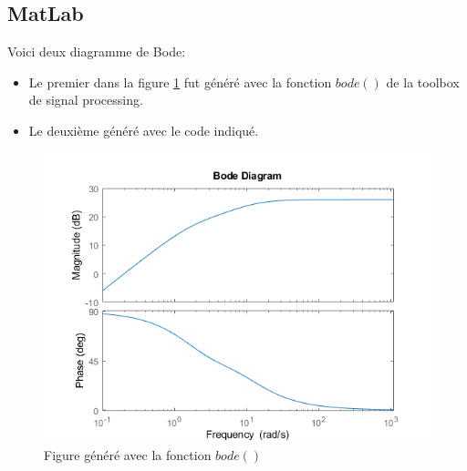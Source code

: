 \documentclass{article}
\theoremstyle{plain}%
\theoremstyle{definition}
\theoremstyle{remark}
\begin{document}
\subsection{MatLab}
Voici deux diagramme de Bode:
\begin{itemize}
    \item Le premier dans la figure \ref{BodeMatLab} fut généré avec la fonction $ bode() $ de la toolbox de signal processing.
    \item Le deuxième généré avec le code indiqué.
\end{itemize}
\begin{figure}[htbp]
    \centering
    \includegraphics*[]{untitled.png}
    \caption{Figure généré avec la fonction $ bode() $ }
    \label{BodeMatLab}
\end{figure}
\end{document}
